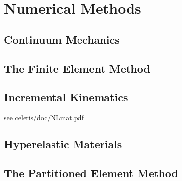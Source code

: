 \chapter{Numerical Methods}
%
\section{Continuum Mechanics}
\label{Continuum Mechanics}
\section{The Finite Element Method}
\label{The Finite Element Method}

\section{Incremental Kinematics}
\label{Incremental Kinematics}
see celeris/doc/NLmat.pdf
\section{Hyperelastic Materials}
\label{Hyperelastic Materials}
\section{The Partitioned Element Method}
\label{The Partitioned Element Method}

